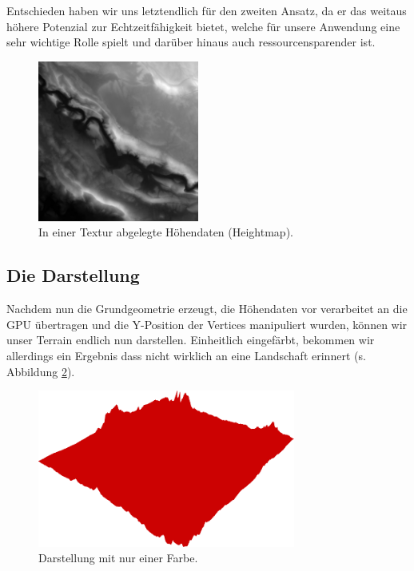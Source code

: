 \begin{Spacing}{\mylinespace}
Entschieden haben wir uns letztendlich für den zweiten Ansatz, da er das weitaus höhere Potenzial zur Echtzeitfähigkeit bietet, welche für unsere Anwendung eine sehr wichtige Rolle spielt und darüber hinaus auch ressourcensparender ist. 

\begin{figure}[h!]
	\centering
	\vspace*{20px}
	\includegraphics[width=200px]{graphics/heightmap.jpg}
	\caption{In einer Textur abgelegte Höhendaten (Heightmap).}
	\label{fig:heightmap}
\end{figure}

\subsection{Die Darstellung}
Nachdem nun die Grundgeometrie erzeugt, die Höhendaten vor verarbeitet an die GPU übertragen und die Y-Position der Vertices manipuliert wurden, können wir unser Terrain endlich nun darstellen. Einheitlich eingefärbt, bekommen wir allerdings ein Ergebnis dass nicht wirklich an eine Landschaft erinnert (s. Abbildung \ref{fig:singleColor}). 

\begin{figure}[h!]
	\centering
	\vspace*{20px}
	\includegraphics[width=320px]{graphics/singleColor.png}
	\caption{Darstellung mit nur einer Farbe.}
	\label{fig:singleColor}
\end{figure}


\end{Spacing}
